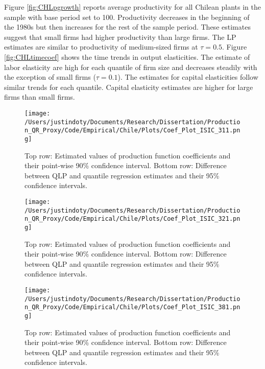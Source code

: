 \documentclass[11pt]{article}
\begin{document}
Figure \ref{fig:CHLpgrowth} reports average productivity for all Chilean plants in the sample with base period set to 100. Productivity decreases in the beginning of the 1980s but then increases for the rest of the sample period. These estimates suggest that small firms had higher productivity than large firms. The LP estimates are similar to productivity of medium-sized firms at $\tau=0.5$. Figure \ref{fig:CHLtimecoef} shows the time trends in output elasticities. The estimate of labor elasticity are high for each quantile of firm size and decreases steadily with the exception of small firms ($\tau=0.1$). The estimates for capital elasticities follow similar trends for each quantile. Capital elasticity estimates are higher for large firms than small firms.


  

\begin{figure}[H]
\centering
\texttt{[image: /Users/justindoty/Documents/Research/Dissertation/Production\_QR\_Proxy/Code/Empirical/Chile/Plots/Coef\_Plot\_ISIC\_311.png]}
\caption{Top row: Estimated values of production function coefficients and their point-wise 90\% confidence interval. Bottom row: Difference between QLP and quantile regression estimates and their 95\% confidence intervals.}
\label{fig:CHL311}
\end{figure}

\begin{figure}[H]
\centering
\texttt{[image: /Users/justindoty/Documents/Research/Dissertation/Production\_QR\_Proxy/Code/Empirical/Chile/Plots/Coef\_Plot\_ISIC\_321.png]}
\caption{Top row: Estimated values of production function coefficients and their point-wise 90\% confidence interval. Bottom row: Difference between QLP and quantile regression estimates and their 95\% confidence intervals.}
\label{fig:CHL321}
\end{figure}

\begin{figure}[H]
\centering
\texttt{[image: /Users/justindoty/Documents/Research/Dissertation/Production\_QR\_Proxy/Code/Empirical/Chile/Plots/Coef\_Plot\_ISIC\_381.png]}
\caption{Top row: Estimated values of production function coefficients and their point-wise 90\% confidence interval. Bottom row: Difference between QLP and quantile regression estimates and their 95\% confidence intervals.}
\label{fig:CHL381}
\end{figure}
\end{document}
